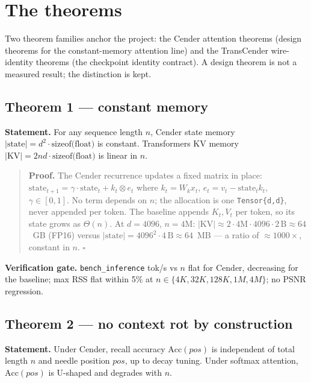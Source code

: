 \chapter{The theorems}

Two theorem families anchor the project: the Cender attention theorems (design theorems for the
constant-memory attention line) and the TransCender wire-identity theorems (the checkpoint
identity contract). A design theorem is not a measured result; the distinction is kept.

\section{Theorem 1 --- constant memory}

\textbf{Statement.} For any sequence length $n$, Cender state memory
$|\text{state}| = d^2 \cdot \text{sizeof(float)}$ is constant. Transformers KV memory
$|\text{KV}| = 2nd\cdot\text{sizeof(float)}$ is linear in $n$.

\begin{quote}
\textbf{Proof.} The Cender recurrence updates a fixed matrix in place:
$\text{state}_{t+1} = \gamma\cdot\text{state}_t + k_t \otimes e_t$ where
$k_t = W_k x_t$, $e_t = v_t - \text{state}_t k_t$, $\gamma \in [0,1]$. No term depends on $n$;
the allocation is one \texttt{Tensor\{d,d\}}, never appended per token. The baseline appends
$K_t, V_t$ per token, so its state grows as $\Theta(n)$. At $d{=}4096$, $n{=}4$M:
$|\text{KV}| \approx 2\cdot4\text{M}\cdot4096\cdot2\,\text{B} \approx 64$~GB (FP16) versus
$|\text{state}| = 4096^2 \cdot 4\,\text{B} \approx 64$~MB --- a ratio of ${\approx}1000\times$,
constant in $n$. \hfill$\square$
\end{quote}

\textbf{Verification gate.} \texttt{bench\_inference} tok/s vs $n$ flat for Cender, decreasing
for the baseline; max RSS flat within 5\% at $n \in \{4K, 32K, 128K, 1M, 4M\}$; no PSNR
regression.

\section{Theorem 2 --- no context rot by construction}

\textbf{Statement.} Under Cender, recall accuracy $\mathrm{Acc}(pos)$ is independent of total
length $n$ and needle position $pos$, up to decay tuning. Under softmax attention,
$\mathrm{Acc}(pos)$ is U-shaped and degrades with $n$.

